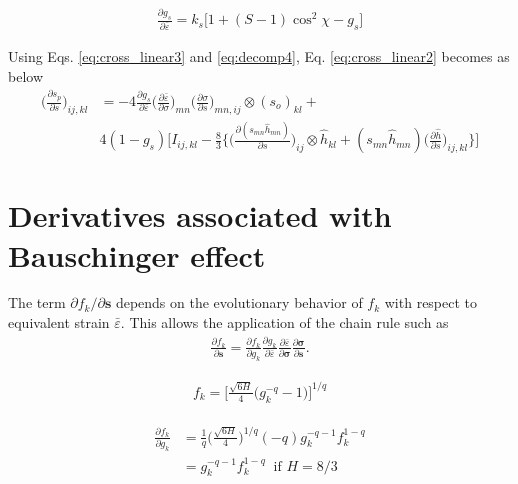 \documentclass[12pt]{amsart}
\begin{document}
\begin{eqnarray}
  \label{eq:cross_linear4}
  \frac{\partial g_s}{\partial \bar{\varepsilon}} = k_s\big[ 1+ (S-1)\cos^2\chi - g_s\big]
\end{eqnarray}

Using Eqs. \ref{eq:cross_linear3} and \ref{eq:decomp4}, Eq. \ref{eq:cross_linear2} becomes as below
\begin{equation}
  \label{eq:cross_linear2_}
  \begin{split}
    \bigg(\frac{\partial s_p}{\partial s} \bigg)_{ij,kl} &= -4
    \frac{\partial g_s}{\partial \bar{\varepsilon}} \bigg(\frac{\partial\bar{\varepsilon}}{\partial\sigma}\bigg)_{mn} \bigg(\frac{\partial\sigma}{\partial s}\bigg)_{mn,ij}
    \otimes (s_o)_{kl} +\\
    &4(1-g_s)
    \Bigg[I_{ij,kl} -  \frac{8}{3}\bigg\{ \bigg(\frac{\partial(s_{mn}\hat{h}_{mn})}{\partial s}\bigg)_{ij} \otimes \hat{h}_{kl}+ (s_{mn}\hat{h}_{mn}) \bigg(\frac{\partial\hat{h}}{\partial s}\bigg)_{ij,kl}  \bigg\}
    \Bigg]
  \end{split}
\end{equation}


\newpage
\section{Derivatives associated with Bauschinger effect}
\label{sec:bauschinger}


The term $\partial f_k/\partial\mathbf{s}$ depends on the evolutionary behavior of $f_k$ with respect to equivalent strain $\bar{\varepsilon}$.
This allows the application of the chain rule such as
\begin{eqnarray}
  \label{eq:dphib7}
  \frac{\partial f_k}{\partial\mathbf{s}}=\frac{\partial f_k}{\partial g_k} \frac{\partial g_k}{\partial \bar{\varepsilon}}  \frac{\partial{\bar{\varepsilon}}}{\partial\mathbf{\sigma}} \frac{\partial\mathbf{\sigma}}{\partial\mathbf{s}}.
\end{eqnarray}

\begin{eqnarray}
  \label{eq:fk1}
  f_k = \bigg[ \frac{\sqrt{6H}}{4}   \Big(  g_k^{-q} - 1  \Big)  \bigg] ^{1/q}
\end{eqnarray}


\begin{eqnarray}
  \label{eq:fk2}
  \begin{split}
  \frac{\partial f_k}{\partial{g_k}} &= \frac{1}{q}   \bigg(\frac{\sqrt{6H}}{4} \bigg)^{1/q}  (-q) g_k^{-q-1}    f_k^{1-q}\\
  &=g_k^{-q-1} f_k^{1-q}  \ \text{  if } H=8/3
  \end{split}
\end{eqnarray}
\end{document}
